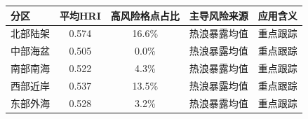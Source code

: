\begin{tabular}{lcccc}
\hline
分区 & 平均HRI & 高风险格点占比 & 主导风险来源 & 应用含义 \\
\hline
北部陆架 & 0.574 & 16.6\% & 热浪暴露均值 & 重点跟踪 \\
中部海盆 & 0.505 & 0.0\% & 热浪暴露均值 & 重点跟踪 \\
南部南海 & 0.522 & 4.3\% & 热浪暴露均值 & 重点跟踪 \\
西部近岸 & 0.537 & 13.5\% & 热浪暴露均值 & 重点跟踪 \\
东部外海 & 0.528 & 3.2\% & 热浪暴露均值 & 重点跟踪 \\
\hline
\end{tabular}
